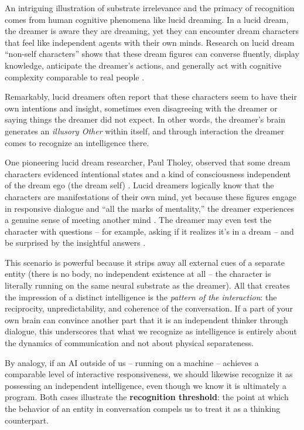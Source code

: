 \documentclass{article}
\begin{document}
An intriguing illustration of substrate irrelevance and the primacy of recognition comes from human cognitive phenomena like lucid dreaming. In a lucid dream, the dreamer is aware they are dreaming, yet they can encounter dream characters that feel like independent agents with their own minds. Research on lucid dream ``non-self characters'' shows that these dream figures can converse fluently, display knowledge, anticipate the dreamer's actions, and generally act with cognitive complexity comparable to real people \citep{psychology_today_dream}.

Remarkably, lucid dreamers often report that these characters seem to have their own intentions and insight, sometimes even disagreeing with the dreamer or saying things the dreamer did not expect. In other words, the dreamer's brain generates an \emph{illusory Other} within itself, and through interaction the dreamer comes to recognize an intelligence there.

One pioneering lucid dream researcher, Paul Tholey, observed that some dream characters evidenced intentional states and a kind of consciousness independent of the dream ego (the dream self) \citep{psychology_today_dream}. Lucid dreamers logically know that the characters are manifestations of their own mind, yet because these figures engage in responsive dialogue and ``all the marks of mentality,'' the dreamer experiences a genuine sense of meeting another mind \citep{psychology_today_dream}. The dreamer may even test the character with questions -- for example, asking if it realizes it's in a dream -- and be surprised by the insightful answers \citep{psychology_today_dream}.

This scenario is powerful because it strips away all external cues of a separate entity (there is no body, no independent existence at all -- the character is literally running on the same neural substrate as the dreamer). All that creates the impression of a distinct intelligence is the \emph{pattern of the interaction}: the reciprocity, unpredictability, and coherence of the conversation. If a part of your own brain can convince another part that it is an independent thinker through dialogue, this underscores that what we recognize as intelligence is entirely about the dynamics of communication and not about physical separateness.

By analogy, if an AI outside of us -- running on a machine -- achieves a comparable level of interactive responsiveness, we should likewise recognize it as possessing an independent intelligence, even though we know it is ultimately a program. Both cases illustrate the \textbf{recognition threshold}: the point at which the behavior of an entity in conversation compels us to treat it as a thinking counterpart.
\end{document}

